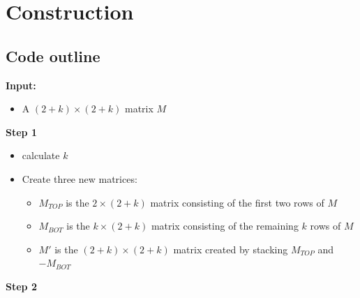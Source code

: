 \documentclass[
  letterpaper,
  DIV=11,
  numbers=noendperiod]{scrreprt}
\providecommand{\tightlist}{%
  \setlength{\itemsep}{0pt}\setlength{\parskip}{0pt}}\usepackage{longtable,booktabs,array}
\begin{document}

\hypertarget{construction}{%
\chapter{Construction}\label{construction}}

\hypertarget{code-outline}{%
\section{Code outline}\label{code-outline}}

\textbf{Input:}

\begin{itemize}
\tightlist
\item
  A \((2+k) \times (2 +k)\) matrix \(M\)
\end{itemize}

\textbf{Step 1}

\begin{itemize}
\item
  calculate \(k\)
\item
  Create three new matrices:

  \begin{itemize}
  \item
    \(M_{TOP}\) is the \(2 \times (2+k)\) matrix consisting of the first
    two rows of \(M\)
  \item
    \(M_{BOT}\) is the \(k \times (2+k)\) matrix consisting of the
    remaining \(k\) rows of \(M\)
  \item
    \(M'\) is the \((2+k) \times (2 +k)\) matrix created by stacking
    \(M_{TOP}\) and \(-M_{BOT}\)
  \end{itemize}
\end{itemize}

\textbf{Step 2}
\end{document}

